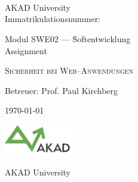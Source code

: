 

\begin{titlepage}


\vspace{5cm}

\Name \\ 
\Strasse \\ 
\PlzOrt\\ 
\href{mailto:\Email}{\Email}

AKAD University\\
Immatrikulationsnummer: \Immatrikulationsnummer

\vfill

\begin{tabbing}
Modul SWE02 --- \=Softentwicklung\\ 
                \>Assignment  
\end{tabbing}
\LARGE
\textsc{Sicherheit bei Web--Anwendungen}\\

\vfill

\normalsize

Betreuer: Prof. Paul Kirchberg

\today %

\vfill

\includegraphics[width=3cm]{akad_logo.png}

AKAD University

\end{titlepage}



\normalsize
